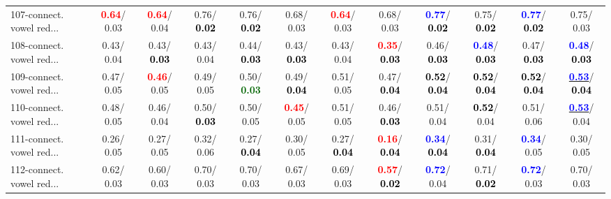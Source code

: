 \begin{table}[h]
\begin{center}
{\begin{tabular}{lc|c|c|c|c|c|c|c|c|c|c}
107-connect. vowel red... & \textcolor{red}{\textbf{  0.64}}/  0.03 & \textcolor{red}{\textbf{  0.64}}/  0.04 &   0.76/\textcolor{black}{\textbf{  0.02}} &   0.76/\textcolor{black}{\textbf{  0.02}} &   0.68/  0.03 & \textcolor{red}{\textbf{  0.64}}/  0.03 &   0.68/  0.03 & \textcolor{blue}{\textbf{  0.77}}/\textcolor{black}{\textbf{  0.02}} &   0.75/\textcolor{black}{\textbf{  0.02}} & \textcolor{blue}{\textbf{  0.77}}/\textcolor{black}{\textbf{  0.02}} &   0.75/  0.03 \\
108-connect. vowel red... &   0.43/  0.04 &   0.43/\textcolor{black}{\textbf{  0.03}} &   0.43/  0.04 &   0.44/\textcolor{black}{\textbf{  0.03}} &   0.43/\textcolor{black}{\textbf{  0.03}} &   0.43/  0.04 & \textcolor{red}{\textbf{  0.35}}/\textcolor{black}{\textbf{  0.03}} &   0.46/\textcolor{black}{\textbf{  0.03}} & \textcolor{blue}{\textbf{  0.48}}/\textcolor{black}{\textbf{  0.03}} &   0.47/\textcolor{black}{\textbf{  0.03}} & \textcolor{blue}{\textbf{  0.48}}/\textcolor{black}{\textbf{  0.03}} \\
109-connect. vowel red... &   0.47/  0.05 & \textcolor{red}{\textbf{  0.46}}/  0.05 &   0.49/  0.05 &   0.50/\textcolor{darkgreen}{\textbf{  0.03}} &   0.49/\textcolor{black}{\textbf{  0.04}} &   0.51/  0.05 &   0.47/\textcolor{black}{\textbf{  0.04}} & \textcolor{black}{\textbf{  0.52}}/\textcolor{black}{\textbf{  0.04}} & \textcolor{black}{\textbf{  0.52}}/\textcolor{black}{\textbf{  0.04}} & \textcolor{black}{\textbf{  0.52}}/\textcolor{black}{\textbf{  0.04}} & \underline{\textcolor{blue}{\textbf{  0.53}}}/\textcolor{black}{\textbf{  0.04}} \\
110-connect. vowel red... &   0.48/  0.05 &   0.46/  0.04 &   0.50/\textcolor{black}{\textbf{  0.03}} &   0.50/  0.05 & \textcolor{red}{\textbf{  0.45}}/  0.05 &   0.51/  0.05 &   0.46/\textcolor{black}{\textbf{  0.03}} &   0.51/  0.04 & \textcolor{black}{\textbf{  0.52}}/  0.04 &   0.51/  0.06 & \underline{\textcolor{blue}{\textbf{  0.53}}}/  0.04 \\ \hline
111-connect. vowel red... &   0.26/  0.05 &   0.27/  0.05 &   0.32/  0.06 &   0.27/\textcolor{black}{\textbf{  0.04}} &   0.30/  0.05 &   0.27/\textcolor{black}{\textbf{  0.04}} & \textcolor{red}{\textbf{  0.16}}/\textcolor{black}{\textbf{  0.04}} & \textcolor{blue}{\textbf{  0.34}}/\textcolor{black}{\textbf{  0.04}} &   0.31/\textcolor{black}{\textbf{  0.04}} & \textcolor{blue}{\textbf{  0.34}}/  0.05 &   0.30/  0.05 \\
112-connect. vowel red... &   0.62/  0.03 &   0.60/  0.03 &   0.70/  0.03 &   0.70/  0.03 &   0.67/  0.03 &   0.69/  0.03 & \textcolor{red}{\textbf{  0.57}}/\textcolor{black}{\textbf{  0.02}} & \textcolor{blue}{\textbf{  0.72}}/  0.04 &   0.71/\textcolor{black}{\textbf{  0.02}} & \textcolor{blue}{\textbf{  0.72}}/  0.03 &   0.70/  0.03 \\

\end{tabular}}
\end{center}
\end{table}
